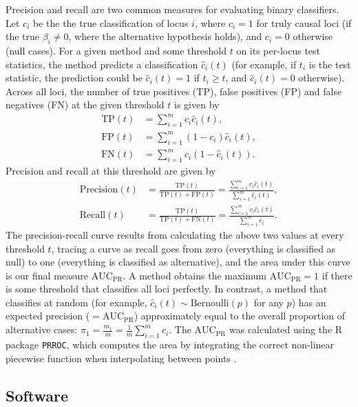 \documentclass[11pt]{article}
\newcommand{\auc}{\text{AUC}_\text{PR}}
\begin{document}
Precision and recall are two common measures for evaluating binary classifiers.
Let $c_i$ be the the true classification of locus $i$, where $c_i = 1$ for truly causal loci (if the true $\beta_i \ne 0$, where the alternative hypothesis holds), and $c_i = 0$ otherwise (null cases).
For a given method and some threshold $t$ on its per-locus test statistics, the method predicts a classification $\hat{c}_i(t)$ (for example, if $t_i$ is the test statistic, the prediction could be $\hat{c}_i(t) = 1$ if $t_i \ge t$, and $\hat{c}_i(t) = 0$ otherwise).
Across all loci, the number of true positives (TP), false positives (FP) and false negatives (FN) at the given threshold $t$ is given by
\begin{align*}
  \text{TP}(t)
  &=
    \sum_{i = 1}^m c_i \hat{c}_i(t)
    , \\
  \text{FP}(t)
  &=
    \sum_{i = 1}^m (1 - c_i) \hat{c}_i(t)
    , \\
  \text{FN}(t)
  &=
    \sum_{i = 1}^m c_i \left( 1 - \hat{c}_i(t) \right)
    .
\end{align*}
Precision and recall at this threshold are given by
\begin{align*}
  \text{Precision}(t)
  &=
    \frac{ \text{TP}(t) }{ \text{TP}(t) + \text{FP}(t) }
    =
    \frac{ \sum_{i = 1}^m c_i \hat{c}_i(t) }{ \sum_{i = 1}^m \hat{c}_i(t) }
    , \\
  \text{Recall}(t)
  &=
    \frac{ \text{TP}(t) }{ \text{TP}(t) + \text{FN}(t) }
    =
    \frac{ \sum_{i = 1}^m c_i \hat{c}_i(t) }{ \sum_{i = 1}^m c_i }
    .
\end{align*}
The precision-recall curve results from calculating the above two values at every threshold $t$, tracing a curve as recall goes from zero (everything is classified as null) to one (everything is classified as alternative), and the area under this curve is our final measure $\auc$.
A method obtains the maximum $\auc = 1$ if there is some threshold that classifies all loci perfectly.
In contrast, a method that classifies at random (for example, $\hat{c}_i(t) \sim \text{Bernoulli}(p)$ for any $p$) has an expected precision ($= \auc$) approximately equal to the overall proportion of alternative cases:
$\pi_1 = \frac{m_1}{m} = \frac{1}{m} \sum_{i = 1}^m c_i$.
The $\auc$ was calculated using the R package \texttt{PRROC}, which computes the area by integrating the correct non-linear piecewise function when interpolating between points \citep{grau_prroc:_2015}.

\subsection{Software}
\end{document}
